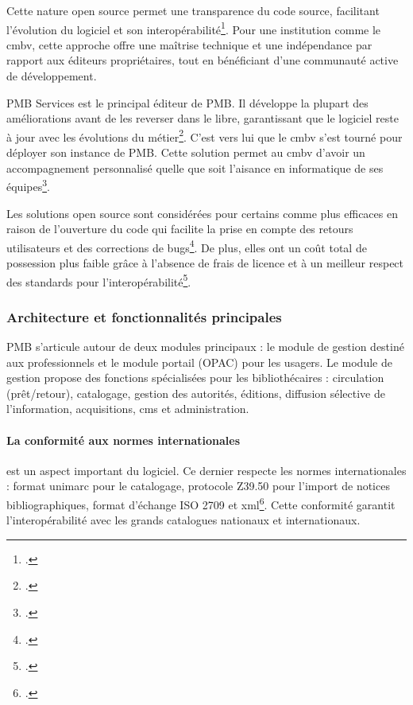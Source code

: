 Cette nature open source permet une transparence du code source, facilitant l'évolution du logiciel et son interopérabilité\footcite{jullienLogicielLibreGerer2022}. Pour une institution comme le \gls{cmbv}, cette approche offre une maîtrise technique et une indépendance par rapport aux éditeurs propriétaires, tout en bénéficiant d'une communauté active de développement.

PMB Services est le principal éditeur de PMB. Il développe la plupart des améliorations avant de les reverser dans le libre, garantissant que le logiciel reste à jour avec les évolutions du métier\footcite{PlaquettePMBServices}. C'est vers lui que le \gls{cmbv} s'est tourné pour déployer son instance de PMB. Cette solution permet au \gls{cmbv} d'avoir un accompagnement personnalisé quelle que soit l'aisance en informatique de ses équipes\footcite{PlaquettePMBServices}.

Les solutions open source sont considérées pour certains comme plus efficaces en raison de l'ouverture du code qui facilite la prise en compte des retours utilisateurs et des corrections de bugs\footcite{jullienLogicielLibreGerer2022}. De plus, elles ont un coût total de possession plus faible grâce à l'absence de frais de licence et à un meilleur respect des standards pour l'interopérabilité\footcite{jullienLogicielLibreGerer2022}.

\subsubsection{Architecture et fonctionnalités principales}

PMB s'articule autour de deux modules principaux : le module de gestion destiné aux professionnels et le module portail (OPAC) pour les usagers. Le module de gestion propose des fonctions spécialisées pour les bibliothécaires : circulation (prêt/retour), catalogage, gestion des autorités, éditions, diffusion sélective de l'information, acquisitions, \gls{cms} et administration.

\paragraph{La conformité aux normes internationales} est un aspect important du logiciel. Ce dernier respecte les normes  internationales : format \gls{unimarc} pour le catalogage, protocole Z39.50 pour l'import de notices bibliographiques, format d'échange ISO 2709 et \gls{xml}\footcite{marcolocascioMigrationBaseDonnees2024}. Cette conformité garantit l'interopérabilité avec les grands catalogues nationaux et internationaux.

